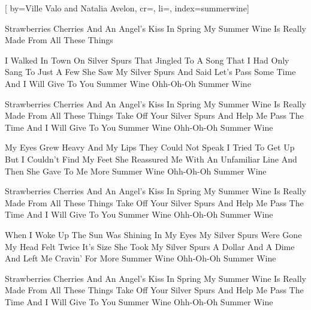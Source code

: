 
[%
    by={Ville Valo and Natalia Avelon},
    cr={},
    li={},
    index={summerwine}]


    \label{summerwine}

    \beginverse*
        Strawberries Cherries And An Angel's Kiss In Spring
        My Summer Wine Is Really Made From All These Things
    \endverse

    \beginverse\memorize[verse]
        I Walked In Town On Silver Spurs That Jingled To
        A Song That I Had Only Sang To Just A Few
        She Saw My Silver Spurs And Said Let's Pass Some Time
        And I Will Give To You Summer Wine
        Ohh-Oh-Oh Summer Wine
    \endverse

    \beginchorus\memorize[chorus]
        Strawberries Cherries And An Angel's Kiss In Spring
        My Summer Wine Is Really Made From All These Things
        Take Off Your Silver Spurs And Help Me Pass The Time
        And I Will Give To You Summer Wine
        Ohh-Oh-Oh Summer Wine
    \endchorus

    \beginverse\replay[verse]
        My Eyes Grew Heavy And My Lips They Could Not Speak
        I Tried To Get Up But I Couldn't Find My Feet
        She Reassured Me With An Unfamiliar Line
        And Then She Gave To Me More Summer Wine
        Ohh-Oh-Oh Summer Wine
    \endverse

    \beginchorus\replay[chorus]
        Strawberries Cherries And An Angel's Kiss In Spring
        My Summer Wine Is Really Made From All These Things
        Take Off Your Silver Spurs And Help Me Pass The Time
        And I Will Give To You Summer Wine
        Ohh-Oh-Oh Summer Wine
    \endchorus

    \beginverse\replay[verse]
        When I Woke Up The Sun Was Shining In My Eyes
        My Silver Spurs Were Gone My Head Felt Twice It's Size
        She Took My Silver Spurs A Dollar And A Dime
        And Left Me Cravin' For More Summer Wine
        Ohh-Oh-Oh Summer Wine
    \endverse

    \beginchorus\replay[chorus]
        Strawberries Cherries And An Angel's Kiss In Spring
        My Summer Wine Is Really Made From All These Things
        Take Off Your Silver Spurs And Help Me Pass The Time
        And I Will Give To You Summer Wine
        Ohh-Oh-Oh Summer Wine
    \endchorus
\endsong
